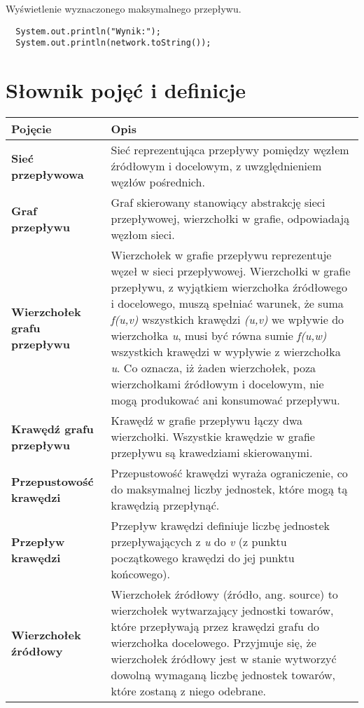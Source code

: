 \documentclass[10pt]{minutes}
\begin{document}
Wyświetlenie wyznaczonego maksymalnego przepływu.
\begin{lstlisting}        
  System.out.println("Wynik:");
  System.out.println(network.toString());
\end{lstlisting}

\section{Słownik pojęć i definicje}
  \begin{longtable}{>{\bfseries}p{} p{}}
    Pojęcie & Opis\\
    \toprule
    Sieć przepływowa  &  
    Sieć reprezentująca przepływy pomiędzy węzłem źródłowym i docelowym, z uwzględnieniem węzłów pośrednich.\\
    \midrule
    Graf przepływu &
    Graf skierowany stanowiący abstrakcję sieci przepływowej, wierzchołki w grafie, odpowiadają węzłom sieci.\\
    \midrule
    Wierzchołek grafu przepływu &
    Wierzchołek w grafie przepływu reprezentuje węzeł w sieci przepływowej. Wierzchołki w grafie przepływu, z wyjątkiem wierzchołka źródłowego 
    i docelowego, muszą spełniać warunek, że suma \emph{f(u,v)} wszystkich krawędzi \emph{(u,v)} we wpływie do wierzchołka 
    \emph{u}, musi być równa sumie \emph{f(u,w)} wszystkich krawędzi w wypływie z wierzchołka \emph{u}. Co oznacza, iż żaden wierzchołek, poza wierzchołkami 
    źródłowym i docelowym, nie mogą produkować ani konsumować przepływu.\\
    \midrule
    Krawędź grafu przepływu &
    Krawędź w grafie przepływu łączy dwa wierzchołki. Wszystkie krawędzie w grafie przepływu są krawedziami skierowanymi.\\
    \midrule
    Przepustowość krawędzi &
    Przepustowość krawędzi wyraża ograniczenie, co do maksymalnej liczby jednostek, które mogą tą krawędzią przepłynąć.\\
    \midrule
    Przepływ krawędzi &
    Przepływ krawędzi definiuje liczbę jednostek przepływających z \emph{u} do \emph{v} (z punktu początkowego krawędzi do jej punktu końcowego).\\
    \midrule
    Wierzchołek źródłowy &
    Wierzchołek źródłowy (źródło, ang. source) to wierzchołek wytwarzający jednostki towarów, które przepływają przez krawędzi grafu do wierzchołka 
    docelowego. Przyjmuje się, że wierzchołek źródłowy jest w stanie wytworzyć dowolną wymaganą liczbę jednostek towarów, które zostaną z niego odebrane.\\

\end{longtable}
\end{document}
